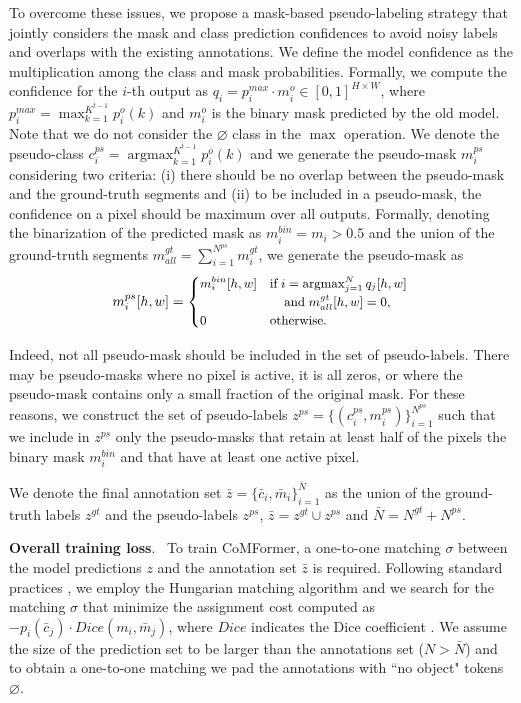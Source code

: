 \documentclass[10pt,twocolumn,letterpaper]{article}
\DeclareMathOperator*{\argmax}{argmax} \newcommand{\parag}[1]{\vspace{0.2cm}\noindent\textbf{#1}.\ }
\begin{document}
To overcome these issues, we propose a mask-based pseudo-labeling strategy that jointly considers the mask and class prediction confidences to avoid noisy labels and overlaps with the existing annotations. 
We define the model confidence as the multiplication among the class and mask probabilities. Formally, we compute the confidence for the $i$-th output as $q_i = p^{max}_i \cdot m^o_i \in [0,1]^{H \times W}$, where $p^{max}_i = \max_{k=1}^{K^{t-1}} p^o_i(k)$ and $m^o_i$ is the binary mask predicted by the old model. Note that we do not consider the $\varnothing$ class in the $\max$ operation. 
We denote the pseudo-class $c^{ps}_i = \argmax_{k=1}^{K^{t-1}} p^o_i(k)$ and we generate the pseudo-mask $m_i^{ps}$ considering two criteria: (i) there should be no overlap between the pseudo-mask and the ground-truth segments and (ii) to be included in a pseudo-mask, the confidence on a pixel should be maximum over all outputs.
Formally, denoting the binarization of the predicted mask as $m_i^{bin} = m_i > 0.5$ and the union of the ground-truth segments $m^{gt}_{all} = \sum_{i=1}^{N^{ps}} m_i^{gt}$, we generate the pseudo-mask as
\begin{equation} \small
    m_i^{ps}[h, w] = \begin{cases}
        m_i^{bin}[h, w]  & \text{if}\; i= \argmax_{j=1}^{N} q_j[h,w] \\ 
        & \;\;\;\; \text{and}\; m^{gt}_{all}[h,w] = 0,\\
        0 & \text{otherwise}.\\
    \end{cases}
\end{equation}

Indeed, not all pseudo-mask should be included in the set of pseudo-labels. There may be pseudo-masks where no pixel is active, \ie it is all zeros, or where the pseudo-mask contains only a small fraction of the original mask. For these reasons, we construct the set of pseudo-labels $z^{ps} = \{(c^{ps}_i, m^{ps}_i)\}_{i=1}^{N^{ps}}$ such that we include in $z^{ps}$ only the pseudo-masks that retain at least half of the pixels \wrt the binary mask $m_i^{bin}$ and that have at least one active pixel.

We denote the final annotation set $\bar{z} = \{\bar{c}_i, \bar{m}_i\}_{i=1}^{\bar{N}}$ as the union of the ground-truth labels $z^{gt}$ and the pseudo-labels $z^{ps}$, \ie $\bar{z} = z^{gt} \cup z^{ps}$ and $\bar{N}=N^{gt}+N^{ps}$. 

\parag{Overall training loss}
To train CoMFormer, a one-to-one matching $\sigma$ between the model predictions $z$ and the annotation set $\bar{z}$ is required. Following standard practices \cite{carion2020end, cheng2021masked}, we employ the Hungarian matching algorithm \cite{kuhn1955hungarianmatching} and we search for the matching $\sigma$ that minimize the assignment cost computed as $-p_i(\bar{c}_j) \cdot Dice(m_i, \bar{m}_j)$, where $Dice$ indicates the Dice coefficient \cite{dice1945diceloss}.
We assume the size of the prediction set to be larger than the annotations set (\ie $N > \bar{N}$) and to obtain a one-to-one matching we pad the annotations with “no object" tokens $\varnothing$. 
\end{document}
